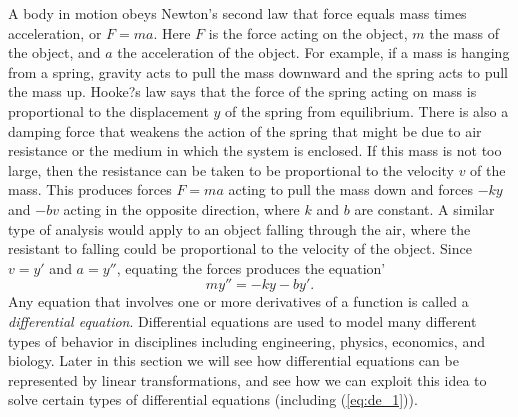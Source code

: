  \label{sec:transformations_eigenvalues}

\vspace*{-17 pt}

\vspace*{13 pt}


A body in motion obeys Newton's second law that force equals mass times acceleration, or $F = ma$. Here $F$ is the force acting on the object, $m$ the mass of the object, and $a$ the acceleration of the object. For example, if a mass is hanging from a spring, gravity acts to pull the mass downward and the spring acts to pull the mass up. Hooke?s law says that the force of the spring acting on mass is proportional to the displacement $y$ of the spring from equilibrium. There is also a damping force that weakens the action of the spring that might be due to air resistance or the medium in which the system is enclosed. If this mass is not too large, then the resistance can be taken to be proportional to the velocity $v$ of the mass. This produces forces $F = ma$ acting to pull the mass down and forces $-ky$ and  $- bv$ acting in the opposite direction, where $k$ and $b$ are constant. A similar type of analysis would apply to an object falling through the air, where the resistant to falling could be proportional to the velocity of the object. Since $v = y'$ and $a = y''$, equating the forces produces the equation'
\begin{equation} \label{eq:de_1}
my'' = -ky-by'.
\end{equation}
Any equation that involves one or more derivatives of a function is called a \emph{differential equation}. Differential equations are used to model many different types of behavior in disciplines including engineering, physics, economics, and biology.  Later in this section we will see how differential equations can be represented by linear transformations, and see how we can exploit this idea to solve certain types of differential equations (including (\ref{eq:de_1})). 


